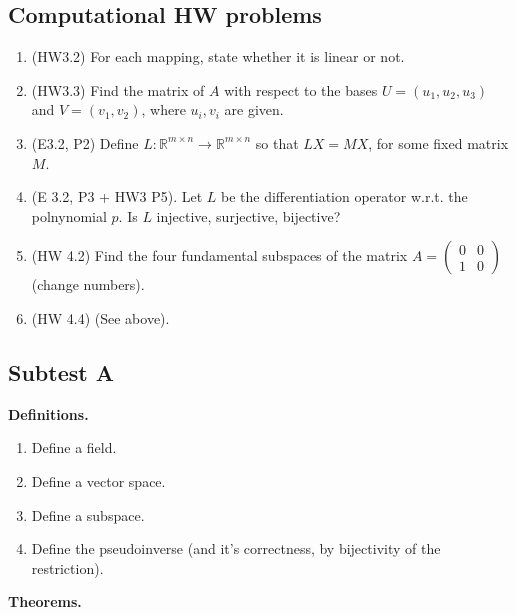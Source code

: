 \documentclass{article}
\newcommand{\mat}[1]{\begin{pmatrix}#1\end{pmatrix}}
\newcommand{\RR}{\mathbb{R}}
\begin{document}
\subsection{Computational HW problems}

\begin{enumerate}
  \item (HW3.2) For each mapping, state whether it is linear or not.
  \item (HW3.3) Find the matrix of $A$ with respect to the bases $U = (u_1, u_2, u_3)$ and $V =(v_1, v_2)$, where $u_i, v_i$ are given.
  \item (E3.2, P2) Define $L: \RR^{m \times n} \to \RR^{m \times n}$ so that $LX = MX$, for some fixed matrix $M$.
  \item (E 3.2, P3 + HW3 P5). Let $L$ be the differentiation operator w.r.t. the polnynomial $p$.  Is $L$ injective, surjective, bijective?

  \item (HW 4.2) Find the four fundamental subspaces of the matrix $A = \mat{0 & 0 \\ 1 & 0}$ (change numbers).
  \item (HW 4.4) (See above).
\end{enumerate}

\subsection{Subtest A}

{\bf Definitions.}

\begin{enumerate}
  \item Define a field.
  \item Define a vector space.
  \item Define a subspace.
  \item Define the pseudoinverse (and it's correctness, by bijectivity of the restriction).
\end{enumerate}

{\bf Theorems.}
\end{document}

